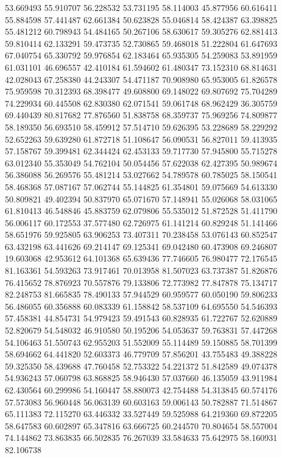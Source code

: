 53.669493
55.910707
56.228532
53.731195
58.114003
45.877956
60.616411
55.884598
57.441487
62.661384
50.623828
55.046814
58.424387
63.398825
55.481212
60.798943
54.484165
50.267106
58.630617
59.305276
62.881413
59.810414
62.133291
59.473735
52.730865
59.468018
51.222804
61.647693
67.040754
65.330792
59.976854
62.183464
65.935305
54.259083
53.891959
61.031101
46.696557
42.410184
61.594602
61.480347
73.152310
68.814631
42.028043
67.258380
44.243307
54.471187
70.908980
65.953005
61.826578
75.959598
70.312393
68.398477
49.608800
69.148022
69.807692
75.704289
74.229934
60.445508
62.830380
62.071541
59.061748
68.962429
36.305759
69.440439
80.817682
77.876560
51.838758
68.359737
75.969256
74.809877
58.189350
56.693510
58.459912
57.514710
59.626395
53.228689
58.229292
52.652263
59.639280
61.872718
51.108647
56.090531
56.827011
59.413935
57.158767
59.399481
62.344424
62.453133
59.717730
57.945800
55.715278
63.012340
55.353049
54.762104
50.054456
57.622038
62.427395
50.989674
56.386088
56.269576
55.481214
53.027662
54.789578
60.785025
58.150541
58.468368
57.087167
57.062744
55.144825
61.354801
59.075669
54.613330
50.809821
49.402394
50.837970
65.071670
57.148941
55.026068
58.031065
61.810413
46.548846
45.883759
62.079806
55.535012
51.872528
51.411790
56.006117
60.172553
37.577480
62.726975
61.141214
60.829248
51.141466
58.651976
59.925805
63.906253
73.407311
70.238458
53.076143
60.852547
63.432198
63.441626
69.214147
69.125341
69.042480
60.473908
69.246807
19.603068
42.953612
64.101368
65.639436
77.746605
76.980477
72.176545
81.163361
54.593263
73.917461
70.013958
81.507023
63.737387
51.826876
76.415652
78.876923
70.557876
79.133806
72.773982
77.847878
75.134717
82.248753
81.665835
78.490133
57.944529
60.959577
60.050190
59.806233
56.486055
60.356888
60.083339
61.158842
58.537109
64.695550
54.546393
57.458381
44.854731
54.979423
59.491543
60.828935
61.722767
52.620889
52.820679
54.548032
46.910580
50.195206
54.053637
59.763831
57.447268
54.106463
51.550743
62.955203
51.552009
55.114489
59.150885
58.701399
58.694662
64.441820
52.603373
46.779709
57.856201
43.755483
49.388228
59.325350
58.439688
47.760458
52.753322
54.221372
51.842589
49.074378
54.936243
57.060798
63.868825
58.946430
57.037660
46.135059
43.911984
62.430564
60.299986
54.160447
58.880073
42.754488
54.313845
60.574176
57.573083
56.960448
56.063139
60.603163
59.006143
50.782887
71.514867
65.111383
72.115270
63.446332
33.527449
59.525988
64.219360
69.872205
58.647583
60.602897
65.347816
63.666725
60.244570
70.804654
58.557004
74.144862
73.863835
66.502835
76.267039
33.584633
75.642975
58.160931
82.106738
